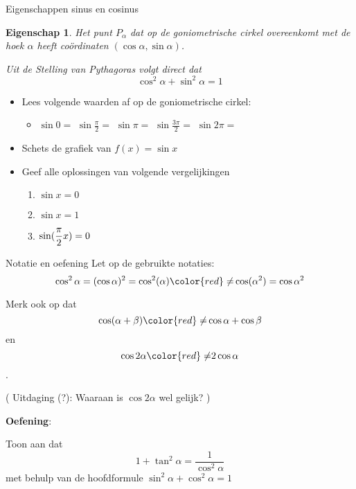 \documentclass{beamer}
\theoremstyle{eigenschap}
\newtheorem{proposition}{Eigenschap}
\begin{document}
\begin{frame}{Eigenschappen sinus en cosinus}

\begin{proposition}
	Het punt $P_\alpha$ dat op de goniometrische cirkel overeenkomt met de hoek $\alpha$ heeft coördinaten $(\cos\alpha,\sin\alpha)$.
	
	Uit de Stelling van Pythagoras volgt direct dat 
	\begin{equation}
	\cos^2\alpha + \sin^2 \alpha = 1 \tag{Hoofdformule goniometrie}
	\end{equation}
	
\end{proposition}

%
\begin{itemize}
	\item Lees volgende waarden af op de goniometrische cirkel:
	\begin{itemize}
		\item[] $\sin 0= $ \hspace{2cm} $\sin \frac{\pi}{2}=$ \hspace{2cm} $\sin \pi=$ \hspace{2cm} $\sin \frac{ 3 \pi}{2}=$ \hspace{2cm} $\sin 2 \pi=$
		
	\end{itemize}
	\item Schets de grafiek van $f(x) = \sin x$
	\newpage
	\item Geef alle oplossingen van volgende  vergelijkingen
	\begin{enumerate}
		\item $\sin x = 0$
		\vspace{3mm}
		\item $\sin x  = 1$
		\vspace{3mm}
		\item $\displaystyle \sin ( \frac{\pi}{2} x) = 0$
	\end{enumerate}
\end{itemize}
%
\end{frame}

\begin{frame}{Notatie en oefening}
Let op de gebruikte notaties: 
$$
\cos^2\alpha = (\cos \alpha)^2 = \cos^2(\alpha) {\color{red}\neq} \cos (\alpha^2) = \cos\alpha^2
$$ 

Merk ook op dat 
$$\cos(\alpha+\beta) {\color{red}\neq} \cos\alpha + \cos\beta$$ en $$\cos 2 \alpha {\color{red}\neq} 2 \cos \alpha$$. 

( Uitdaging (?): Waaraan is $\cos 2\alpha$ wel gelijk? )

\textbf{Oefening}: 

Toon aan dat 
$$
 1 + \tan^2 \alpha = \frac{1}{\cos^2 \alpha}
 $$ met behulp van de hoofdformule $\sin^2 \alpha + \cos^2 \alpha = 1$

\end{frame}
\end{document}
